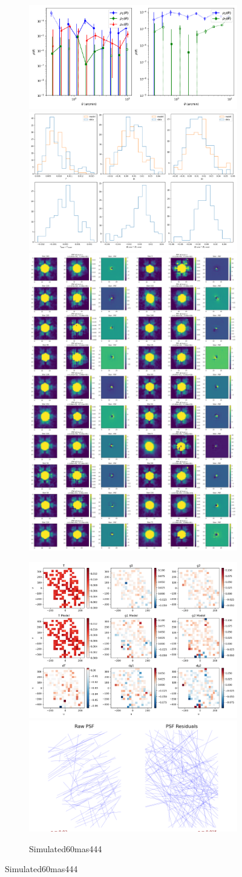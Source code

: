 \documentclass[a4 paper]{article}
\numberwithin{equation}{section}
\newcommand{\0}{\mathbf{0}}
\begin{document}
\begin{figure}[!h]
  \begin{subfigure}{\linewidth}
  \includegraphics[width=.3\linewidth]{Simulated60mas444/piff_rho.png}\hfill
  \includegraphics[width=.3\linewidth]{Simulated60mas444/piff_shapes.png}\hfill
  \includegraphics[width=.3\linewidth]{Simulated60mas444/piff_stars.png}
  \end{subfigure}\par\medskip
  \begin{subfigure}{\linewidth}
  \includegraphics[width=.3\linewidth]{Simulated60mas444/piff_twod.png}\hfill
  \includegraphics[width=.3\linewidth]{Simulated60mas444/piff_whisker.png}\hfill
  \caption{Simulated60mas444}
  \end{subfigure}\par\medskip


\end{figure}
\clearpage
\end{document}
